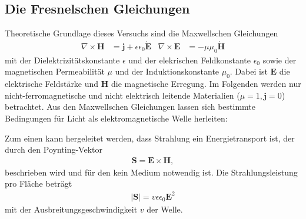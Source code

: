 \subsection{Die Fresnelschen Gleichungen}
Theoretische Grundlage dieses Versuchs sind die Maxwellschen Gleichungen
\begin{align}
    \nabla \times \symbf{H} &= \symbf{j} + \epsilon \epsilon_0 \dot{\symbf{E}}
     & \nabla \times \symbf{E} &= - \mu \mu_0 \dot{\symbf{H}}
\end{align}
mit der Dielektrizitätskonstante $\epsilon$ und der elekrischen Feldkonstante $\epsilon_0$ sowie der magnetischen Permeabilität $\mu$ und der Induktionskonstante $\mu_0$.
Dabei ist $\symbf{E}$ die elektrische Feldstärke und $\symbf{H}$ die magnetische Erregung.
Im Folgenden werden nur nicht-ferromagnetische und nicht elektrisch leitende Materialien ($\mu = 1, \symbf{j} = 0$) betrachtet.
Aus den Maxwellschen Gleichungen lassen sich bestimmte Bedingungen für Licht als elektromagnetische Welle herleiten:

\noindent
Zum einen kann hergeleitet werden, dass Strahlung ein Energietransport ist, der durch den Poynting-Vektor
\begin{align}
    \symbf{S} = \symbf{E} \times \symbf{H},
    \label{eq:poynting}
\end{align}
beschrieben wird und für den kein Medium notwendig ist.
Die Strahlungsleistung pro Fläche beträgt
\begin{align}
    \left|\symbf{S}\right| = v \epsilon \epsilon_0 \symbf{E}^2
    \label{eq:leistung}
\end{align}
mit der Ausbreitungsgeschwindigkeit $v$ der Welle.

